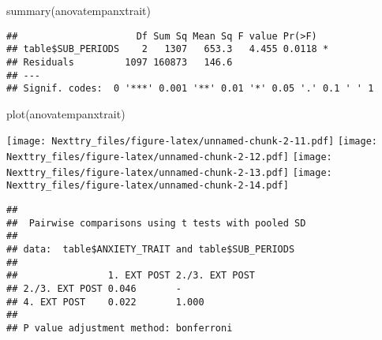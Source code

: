 \documentclass[
]{book}
\newenvironment{Shaded}{\begin{snugshade}}{\end{snugshade}}
\newcommand{\AttributeTok}[1]{\textcolor[rgb]{0.77,0.63,0.00}{#1}}
\newcommand{\CommentTok}[1]{\textcolor[rgb]{0.56,0.35,0.01}{\textit{#1}}}
\newcommand{\ConstantTok}[1]{\textcolor[rgb]{0.00,0.00,0.00}{#1}}
\newcommand{\FunctionTok}[1]{\textcolor[rgb]{0.00,0.00,0.00}{#1}}
\newcommand{\NormalTok}[1]{#1}
\newcommand{\SpecialCharTok}[1]{\textcolor[rgb]{0.00,0.00,0.00}{#1}}
\newcommand{\StringTok}[1]{\textcolor[rgb]{0.31,0.60,0.02}{#1}}
\begin{document}
\begin{Shaded}
\begin{Highlighting}[]
\FunctionTok{summary}\NormalTok{(anovatempanxtrait)}
\end{Highlighting}
\end{Shaded}

\begin{verbatim}
##                     Df Sum Sq Mean Sq F value Pr(>F)  
## table$SUB_PERIODS    2   1307   653.3   4.455 0.0118 *
## Residuals         1097 160873   146.6                 
## ---
## Signif. codes:  0 '***' 0.001 '**' 0.01 '*' 0.05 '.' 0.1 ' ' 1
\end{verbatim}

\begin{Shaded}
\begin{Highlighting}[]
\FunctionTok{plot}\NormalTok{(anovatempanxtrait)}
\end{Highlighting}
\end{Shaded}

\texttt{[image: Nexttry\_files/figure-latex/unnamed-chunk-2-11.pdf]} \texttt{[image: Nexttry\_files/figure-latex/unnamed-chunk-2-12.pdf]} \texttt{[image: Nexttry\_files/figure-latex/unnamed-chunk-2-13.pdf]} \texttt{[image: Nexttry\_files/figure-latex/unnamed-chunk-2-14.pdf]}

\begin{Shaded}
\end{Shaded}

\begin{verbatim}
## 
##  Pairwise comparisons using t tests with pooled SD 
## 
## data:  table$ANXIETY_TRAIT and table$SUB_PERIODS 
## 
##                1. EXT POST 2./3. EXT POST
## 2./3. EXT POST 0.046       -             
## 4. EXT POST    0.022       1.000         
## 
## P value adjustment method: bonferroni
\end{verbatim}

\begin{Shaded}
\end{Shaded}
\end{document}
